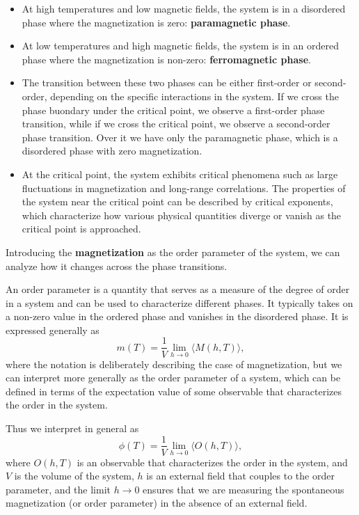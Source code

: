 \begin{itemize}
    \item At high temperatures and low magnetic fields, the system is in a disordered phase where the magnetization is zero: \textbf{paramagnetic phase}.
    \item At low temperatures and high magnetic fields, the system is in an ordered phase where the magnetization is non-zero: \textbf{ferromagnetic phase}.
    \item The transition between these two phases can be either first-order or second-order, depending on the specific interactions in the system. If we cross the phase buondary under the critical point, we observe a first-order phase transition, while if we cross the critical point, we observe a second-order phase transition. Over it we have only the paramagnetic phase, which is a disordered phase with zero magnetization.
    \item At the critical point, the system exhibits critical phenomena such as large fluctuations in magnetization and long-range correlations. The properties of the system near the critical point can be described by critical exponents, which characterize how various physical quantities diverge or vanish as the critical point is approached.
\end{itemize}

Introducing the \textbf{magnetization} as the order parameter of the system, we can analyze how it changes across the phase transitions.

\begin{definition}
    An order parameter is a quantity that serves as a measure of the degree of order in a system and can be used to characterize different phases. It typically takes on a non-zero value in the ordered phase and vanishes in the disordered phase. It is expressed generally as
    \[
        m(T) = \frac{1}{V} \lim_{h \to 0} \langle M(h,T) \rangle,
    \]
    where the notation is deliberately describing the case of magnetization, but we can interpret more generally as the order parameter of a system, which can be defined in terms of the expectation value of some observable that characterizes the order in the system.

    Thus we interpret in general as
    \[
        \phi(T) = \frac{1}{V} \lim_{h \to 0} \langle O(h,T) \rangle,
    \]
    where $O(h,T)$ is an observable that characterizes the order in the system, and $V$ is the volume of the system, \(h\) is an external field that couples to the order parameter, and the limit \(h \to 0\) ensures that we are measuring the spontaneous magnetization (or order parameter) in the absence of an external field.
\end{definition}

